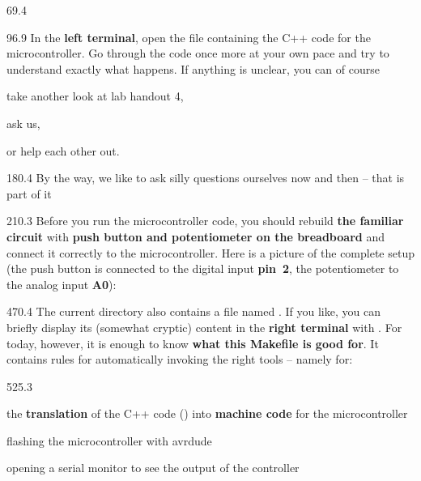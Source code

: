 \documentclass{aslab}
\begin{document}
\nextpage
\begin{region}{69.4}
\end{region}

\begin{region}[pitch=13.1]{96.9}
In the \textbf{left terminal}, open the file  containing
the C++ code for the microcontroller. Go through the code once more at your
own pace and try to understand exactly what happens. If anything is
unclear, you can of course
\begin{dashlist}
\item take another look at lab handout 4,
\item ask us,
\item or help each other out.
\end{dashlist}
\end{region}

\begin{region}{180.4}
By the way, we like to ask silly questions ourselves now and then -- that is
part of it 
\end{region}

\begin{region}[pitch=14.27]{210.3}
Before you run the microcontroller code, you should rebuild \textbf{the
familiar circuit} with \textbf{push button and potentiometer on the
breadboard} and connect it correctly to the microcontroller. Here is a
picture of the complete setup (the push button is connected to the digital
input \textbf{pin~2}, the potentiometer to the analog input \textbf{A0}):
\end{region}


\begin{region}[pitch=14.0]{470.4}
The current directory  also contains a file named
. If you like, you can briefly display its (somewhat cryptic)
content in the \textbf{right terminal} with . For today,
however, it is enough to know \textbf{what this Makefile is good for}. It
contains rules for automatically invoking the right tools -- namely for:
\end{region}

\begin{region}[pitch=13.4]{525.3}
\begin{dashlist}
\item the \textbf{translation} of the C++ code () into
  \textbf{machine code} for the microcontroller
\item flashing the microcontroller with avrdude
\item opening a serial monitor to see the output of the controller
\end{dashlist}
\end{region}
\end{document}
